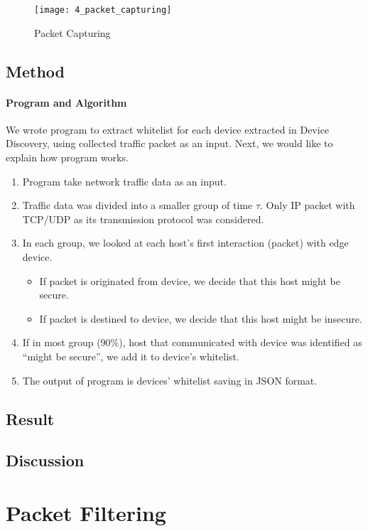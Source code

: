 \begin{figure}[h]
    \centering 
    \texttt{[image: 4\_packet\_capturing]}
    \caption{Packet Capturing}
    \label{fig:s4_packet_capturing}
\end{figure}

\subsection{Method}
\paragraph{Program and Algorithm}
We wrote program to extract whitelist for each device extracted in Device Discovery, using collected traffic packet as an input. Next, we would like to explain how program works.

\begin{enumerate}
    \item Program take network traffic data as an input. 
    \item Traffic data was divided into a smaller group of time $\tau$. Only IP packet with TCP/UDP as its transmission protocol was considered. 
    \item In each group, we looked at each host’s first interaction (packet) with edge device.
    \begin{itemize}
        \item If packet is originated from device, we decide that this host might be secure.
        \item If packet is destined to device, we decide that this host might be insecure.
    \end{itemize}
    \item If in most group (90\%), host that communicated with device was identified as “might be secure”, we add it to device’s whitelist.
    \item The output of program is devices’ whitelist saving in JSON format.
\end{enumerate}

\subsection{Result}
\subsection{Discussion}

\section{Packet Filtering}
